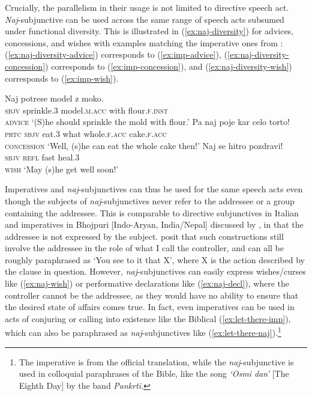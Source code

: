 \documentclass[output=paper,colorlinks,citecolor=brown]{langscibook}
\begin{document}
Crucially, the parallelism in their usage is not limited to directive speech act. \emph{Naj}-subjunctive can be used across the same range of speech acts subsumed under functional diversity. This is illustrated in (\ref{ex:naj-diversity}) for advices, concessions, and wishes with examples matching the imperative ones from : (\ref{ex:naj-diversity-advice}) corresponds to (\ref{ex:imp-advice}), (\ref{ex:naj-diversity-concession}) corresponds to (\ref{ex:imp-concession}), and (\ref{ex:naj-diversity-wish}) corresponds to (\ref{ex:imp-wish}).

\ea {}\label{ex:naj-diversity}
\ea \label{ex:naj-diversity-advice}
\gll Naj potrese model z moko.\\
     \textsc{sbjv} sprinkle.\textsc{3} model.\textsc{m.acc} with flour.\textsc{f.inst}\\ \hfill\textsc{advice}%
\glt `(S)he should sprinkle the mold with flour.'      
\ex \label{ex:naj-diversity-concession}
\gll Pa naj poje kar celo torto!\\
     \textsc{prtc} \textsc{sbjv} eat.\textsc{3} what whole.\textsc{f.acc} cake.\textsc{f.acc}\\ \hfill \textsc{concession}%
\glt `Well, (s)he can eat the whole cake then!'     
\ex \label{ex:naj-diversity-wish}
\gll Naj se hitro pozdravi!\\
     \textsc{sbjv} \textsc{refl} fast heal.\textsc{3}\\ \hfill \textsc{wish}%
\glt `May (s)he get well soon!'     
\z\z

\noindent Imperatives and \emph{naj}-subjunctives can thus be used for the same speech acts even though the subjects of \emph{naj}-subjunctives never refer to the addressee or a group containing the addressee. This is comparable to directive subjunctives in Italian and \trd{} imperatives in Bhojpuri [Indo-Aryan, India/Nepal] discussed by \citet{zpp12}, in that the addressee is not expressed by the subject. \citeauthor{zpp12} posit that such constructions still involve the addressee in the role of what I call the controller, and can all be roughly paraphrased as `You see to it that X', where X is the action described by the clause in question. 
However, \emph{naj}-subjunctives can easily express wishes/curses like (\ref{ex:naj-wish}) or performative declarations like (\ref{ex:naj-decl}), where the controller cannot be the addressee, as they would have no ability to ensure that the desired state of affairs comes true. In fact, even imperatives can be used in acts of conjuring or calling into existence like the Biblical (\ref{ex:let-there-imp}), which can also be paraphrased as \emph{naj}-subjunctives like (\ref{ex:let-there-naj}).\footnote{The imperative is from the official translation, while the \emph{naj}-subjunctive is used in colloquial paraphrases of the Bible, like the song \emph{`Osmi dan'} [The Eighth Day] by the band \emph{Pankrti}.}  
\end{document}
